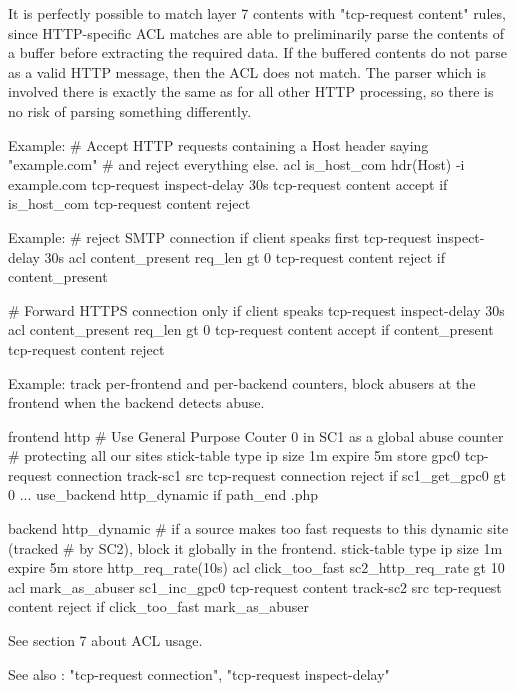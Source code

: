   It is perfectly possible to match layer 7 contents with "tcp-request content"
  rules, since HTTP-specific ACL matches are able to preliminarily parse the
  contents of a buffer before extracting the required data. If the buffered
  contents do not parse as a valid HTTP message, then the ACL does not match.
  The parser which is involved there is exactly the same as for all other HTTP
  processing, so there is no risk of parsing something differently.

  Example:
        # Accept HTTP requests containing a Host header saying "example.com"
        # and reject everything else.
        acl is_host_com hdr(Host) -i example.com
        tcp-request inspect-delay 30s
        tcp-request content accept if is_host_com
        tcp-request content reject

  Example:
        # reject SMTP connection if client speaks first
        tcp-request inspect-delay 30s
        acl content_present req_len gt 0
        tcp-request content reject if content_present

        # Forward HTTPS connection only if client speaks
        tcp-request inspect-delay 30s
        acl content_present req_len gt 0
        tcp-request content accept if content_present
        tcp-request content reject

  Example: track per-frontend and per-backend counters, block abusers at the
           frontend when the backend detects abuse.

        frontend http
            # Use General Purpose Couter 0 in SC1 as a global abuse counter
            # protecting all our sites
            stick-table type ip size 1m expire 5m store gpc0
            tcp-request connection track-sc1 src
            tcp-request connection reject if { sc1_get_gpc0 gt 0 }
            ...
            use_backend http_dynamic if { path_end .php }

        backend http_dynamic
            # if a source makes too fast requests to this dynamic site (tracked
            # by SC2), block it globally in the frontend.
            stick-table type ip size 1m expire 5m store http_req_rate(10s)
            acl click_too_fast sc2_http_req_rate gt 10
            acl mark_as_abuser sc1_inc_gpc0
            tcp-request content track-sc2 src
            tcp-request content reject if click_too_fast mark_as_abuser

  See section 7 about ACL usage.

  See also : "tcp-request connection", "tcp-request inspect-delay"



